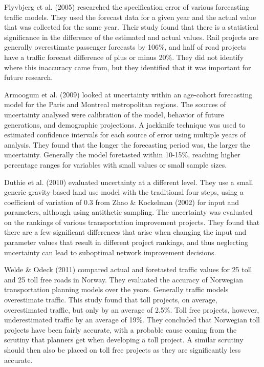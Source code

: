 \documentclass[fancy, masters,twoside]{byuthesis}
\begin{document}
Flyvbjerg et al. (2005) researched the specification error of various forecasting traffic models. They used the forecast data for a given year and the actual value that was collected for the same year. Their study found that there is a statistical significance in the difference of the estimated and actual values. Rail projects are generally overestimate passenger forecasts by 106\%, and half of road projects have a traffic forecast difference of plus or minus 20\%. They did not identify where this inaccuracy came from, but they identified that it was important for future research.

Armoogum et al. (2009) looked at uncertainty within an age-cohort forecasting model for the Paris and Montreal metropolitan regions. The sources of uncertainty analysed were calibration of the model, behavior of future generations, and demographic projections. A jackknife technique was used to estimated confidence intervals for each source of error using multiple years of analysis. They found that the longer the forecasting period was, the larger the uncertainty. Generally the model foretasted within 10-15\%, reaching higher percentage ranges for variables with small values or small sample sizes.

Duthie et al. (2010) evaluated uncertainty at a different level. They use a small generic gravity-based land use model with the traditional four steps, using a coefficient of variation of 0.3 from Zhao \& Kockelman (2002) for input and parameters, although using antithetic sampling. The uncertainty was evaluated on the rankings of various transportation improvement projects. They found that there are a few significant differences that arise when changing the input and parameter values that result in different project rankings, and thus neglecting uncertainty can lead to suboptimal network improvement decisions.

Welde \& Odeck (2011) compared actual and foretasted traffic values for 25 toll and 25 toll free roads in Norway. They evaluated the accuracy of Norwegian transportation planning models over the years. Generally traffic models overestimate traffic. This study found that toll projects, on average, overestimated traffic, but only by an average of 2.5\%. Toll free projects, however, underestimated traffic by an average of 19\%. They concluded that Norwegian toll projects have been fairly accurate, with a probable cause coming from the scrutiny that planners get when developing a toll project. A similar scrutiny should then also be placed on toll free projects as they are significantly less accurate.
\end{document}
